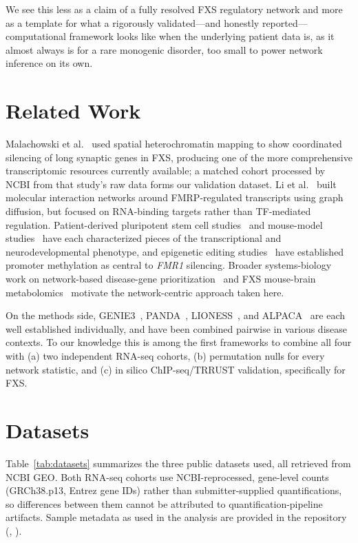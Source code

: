 \documentclass[journal]{IEEEtran}
\newcommand{\gene}[1]{\textit{#1}}
\begin{document}
We see this less as a claim of a fully resolved FXS regulatory network and more as a template for what a rigorously validated---and honestly reported---computational framework looks like when the underlying patient data is, as it almost always is for a rare monogenic disorder, too small to power network inference on its own.

\section{Related Work}
Malachowski et al.~\cite{malachowski2023} used spatial heterochromatin mapping to show coordinated silencing of long synaptic genes in FXS, producing one of the more comprehensive transcriptomic resources currently available; a matched cohort processed by NCBI from that study's raw data forms our validation dataset. Li et al.~\cite{li2020} built molecular interaction networks around FMRP-regulated transcripts using graph diffusion, but focused on RNA-binding targets rather than TF-mediated regulation. Patient-derived pluripotent stem cell studies~\cite{boland2017,lu2016} and mouse-model studies~\cite{rogers2017,arsenault2021} have each characterized pieces of the transcriptional and neurodevelopmental phenotype, and epigenetic editing studies~\cite{liu2018,brykczynska2016} have established promoter methylation as central to \gene{FMR1} silencing. Broader systems-biology work on network-based disease-gene prioritization~\cite{nitsch2009} and FXS mouse-brain metabolomics~\cite{davidovic2011} motivate the network-centric approach taken here.

On the methods side, GENIE3~\cite{genie3}, PANDA~\cite{panda}, LIONESS~\cite{lioness}, and ALPACA~\cite{alpaca} are each well established individually, and have been combined pairwise in various disease contexts. To our knowledge this is among the first frameworks to combine all four with (a) two independent RNA-seq cohorts, (b) permutation nulls for every network statistic, and (c) in silico ChIP-seq/TRRUST validation, specifically for FXS.

\section{Datasets}
Table~\ref{tab:datasets} summarizes the three public datasets used, all retrieved from NCBI GEO. Both RNA-seq cohorts use NCBI-reprocessed, gene-level counts (GRCh38.p13, Entrez gene IDs) rather than submitter-supplied quantifications, so differences between them cannot be attributed to quantification-pipeline artifacts. Sample metadata as used in the analysis are provided in the repository (, ).
\end{document}
